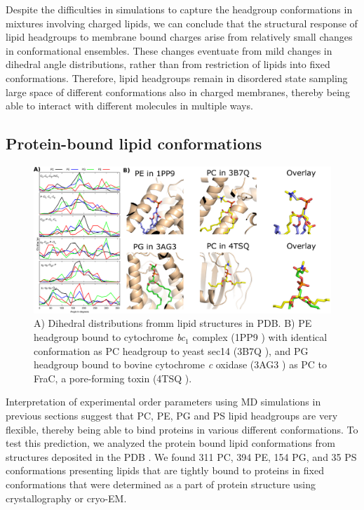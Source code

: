\documentclass[aps,prl,superscriptaddress,twocolumn]{revtex4}
\begin{document}
Despite the difficulties in simulations to capture the headgroup conformations in mixtures involving charged lipids,
we can conclude that the structural response of lipid headgroups to 
membrane bound charges arise from relatively small changes in conformational ensembles.
These changes eventuate from mild changes in dihedral angle distributions, rather than from restriction of lipids into
fixed conformations. Therefore, lipid headgroups remain in disordered state sampling large space of different conformations
also in charged membranes, thereby being able to interact with different molecules in multiple ways.



\subsection{Protein-bound lipid conformations}

\begin{figure}[]
  \centering
  \includegraphics[width=19.0cm]{./Figs/figure4.eps}
  \caption{\label{dihedralsFROMpdb}
    A) Dihedral distributions fromm lipid structures in PDB.
    B) PE headgroup bound to cytochrome {\it bc}$_1$ complex (1PP9 \cite{huang05})
    with identical conformation as PC headgroup to yeast sec14 (3B7Q \cite{schaaf08}),
    and PG headgroup bound to bovine cytochrome {\it c} oxidase (3AG3 \cite{muramoto10})
    as PC to FraC, a pore-forming toxin (4TSQ \cite{tanaka15}).
  }
\end{figure}


Interpretation of experimental order parameters using MD simulations
in previous sections suggest that PC, PE, PG and PS lipid headgroups are very flexible,
thereby being able to bind proteins in various different conformations.
To test this prediction, we analyzed the protein bound lipid conformations
from structures deposited in the PDB \cite{berman00}.
We found 311 PC, 394 PE, 154 PG, and 35 PS conformations presenting
lipids that are tightly bound to proteins in fixed conformations
that were determined as a part of protein structure using crystallography or cryo-EM. 
\end{document}
